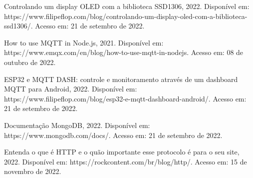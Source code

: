 \documentclass[openright]{normas-utf-tex} %
\begin{document}
Controlando um display OLED com a biblioteca SSD1306, 2022. Disponível em: https://www.filipeflop.com/blog/controlando-um-display-oled-com-a-biblioteca-ssd1306/. Acesso em: 21 de setembro de 2022.

How to use MQTT in Node.js, 2021. Disponível em: https://www.emqx.com/en/blog/how-to-use-mqtt-in-nodejs. Acesso em: 08 de outubro de 2022.

ESP32 e MQTT DASH: controle e monitoramento através de um dashboard MQTT para Android, 2022. Disponível em: https://www.filipeflop.com/blog/esp32-e-mqtt-dashboard-android/. Acesso em: 21 de setembro de 2022.

Documentação MongoDB, 2022. Disponível em: https://www.mongodb.com/docs/. Acesso em: 21 de setembro de 2022.

Entenda o que é HTTP e o quão importante esse protocolo é para o seu site, 2022. Disponível em: https://rockcontent.com/br/blog/http/. Acesso em: 15 de novembro de 2022.








%
%
%
%
\end{document}
